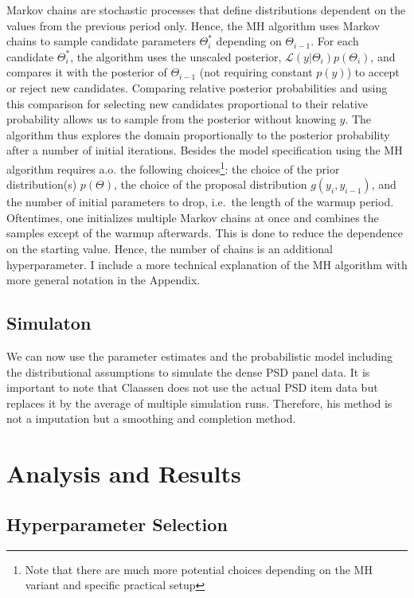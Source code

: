 \documentclass[12pt,english,a4paper,oneside]{article}
\theoremstyle{definition}
\theoremstyle{definition}
\theoremstyle{definition}
\theoremstyle{definition}
\theoremstyle{remark}
\begin{document}
Markov chains are stochastic processes that define distributions dependent on the values from the previous period only. Hence, the MH algorithm uses Markov chains to sample candidate parameters \(\Theta_i^*\) depending on \(\Theta_{i-1}\). For each candidate \(\Theta_i^*\), the algorithm uses the unscaled posterior, \(\mathcal{L}(y|\Theta_i)p(\Theta_i)\), and compares it with the posterior of \(\Theta_{i-1}\) (not requiring constant \(p(y)\)) to accept or reject new candidates. Comparing relative posterior probabilities and using this comparison for selecting new candidates proportional to their relative probability allows us to sample from the posterior without knowing \(y\). The algorithm thus explores the domain proportionally to the posterior probability after a number of initial iterations. Besides the model specification using the MH algorithm requires a.o. the following choices\footnote{Note that there are much more potential choices depending on the MH variant and specific practical setup}: the choice of the prior distribution(s) \(p(\Theta)\), the choice of the proposal distribution \(g(y_i, y_{i-1})\), and the number of initial parameters to drop, i.e.~the length of the warmup period. Oftentimes, one initializes multiple Markov chains at once and combines the samples except of the warmup afterwards. This is done to reduce the dependence on the starting value. Hence, the number of chains is an additional hyperparameter. I include a more technical explanation of the MH algorithm with more general notation in the Appendix.

\hypertarget{simulaton}{%
\subsection{Simulaton}\label{simulaton}}

We can now use the parameter estimates and the probabilistic model including the distributional assumptions to simulate the dense PSD panel data. It is important to note that Claassen does not use the actual PSD item data but replaces it by the average of multiple simulation runs. Therefore, his method is not a imputation but a smoothing and completion method.

\hypertarget{analysis-and-results}{%
\section{Analysis and Results}\label{analysis-and-results}}

\hypertarget{hyperparameter-selection}{%
\subsection{Hyperparameter Selection}\label{hyperparameter-selection}}
\end{document}
